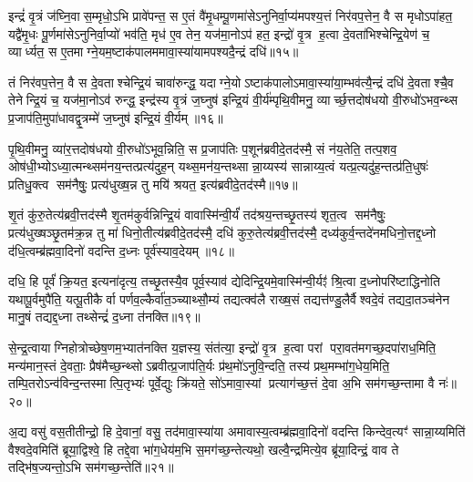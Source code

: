 {\anuvakamend[{अ॒स्य॒ मा वेदा द्यावा॑पृथि॒व्योर॑ब्रवी॒दिति॒ तस्माच्च॒त्वारि॑ च॥२॥}]}

इन्द्रं॑ वृ॒त्रं ज॑घ्नि॒वास॒म्मृधो॒ऽभि प्रावे॑पन्त॒ स ए॒तं वै॑मृ॒धम्पू॒णमा॑सेऽनुनिर्वा॒प्य॑मपश्य॒त्तं निर॑वप॒त्तेन॒ वै स मृधोऽपा॑हत॒ यद्वै॑मृ॒धः पू॒र्णमा॑सेऽनुनिर्वा॒प्यो॑ भव॑ति॒ मृध॑ ए॒व तेन॒ यज॑मा॒नोऽप॑ हत॒ इन्द्रो॑ वृ॒त्र ह॒त्वा दे॒वता॑भिश्चेन्द्रि॒येण॑ च॒ व्यार्ध्यत॒ स ए॒तमाग्ने॒यम॒ष्टाक॑पालममावा॒स्या॑यामपश्यदै॒न्द्रं दधि॑॥१५॥

तं निर॑वप॒त्तेन॒ वै स दे॒वताश्चेन्द्रि॒यं चावा॑रुन्द्ध॒ यदाग्ने॒योऽष्टाक॑पालोऽमावा॒स्या॑या॒म्भव॑त्यै॒न्द्रं दधि॑ दे॒वताश्चै॒व तेनेन्द्रि॒यं च॒ यज॑मा॒नोऽव॑ रुन्द्ध॒ इन्द्र॑स्य वृ॒त्रं ज॒घ्नुष॑ इन्द्रि॒यं वी॒र्य॑म्पृथि॒वीमनु॒ व्यार्च्छ॒त्तदोष॑धयो वी॒रुधो॑ऽभव॒न्थ्स प्र॒जाप॑ति॒मुपा॑धावद्वृ॒त्रम्मे॑ ज॒घ्नुष॑ इन्द्रि॒यं वी॒र्यम्॥१६॥

पृ॒थि॒वीमनु॒ व्या॑र॒त्तदोष॑धयो वी॒रुधो॑ऽभूव॒न्निति॒ स प्र॒जाप॑तिः प॒शून॑ब्रवीदे॒तद॑स्मै॒ सं न॑य॒तेति॒ तत्प॒शव॒ ओष॑धी॒भ्योऽध्या॒त्मन्थ्सम॑नय॒न्तत्प्रत्य॑दुह॒न् यथ्स॒मन॑य॒न्तथ्सान्ना॒य्यस्य॑ सान्नाय्य॒त्वं यत्प्र॒त्यदु॑ह॒न्तत्प्र॑ति॒धुषः॑ प्रतिधु॒क्त्व सम॑नैषुः॒ प्रत्य॑धुख्ष॒न्न तु मयि॑ श्रयत॒ इत्य॑ब्रवीदे॒तद॑स्मै॥१७॥

शृ॒तं कु॑रु॒तेत्य॑ब्रवी॒त्तद॑स्मै शृ॒तम॑कुर्वन्निन्द्रि॒यं वावास्मि॑न्वी॒र्यं॑ तद॑श्रय॒न्तच्छृ॒तस्य॑ शृत॒त्व सम॑नैषुः॒ प्रत्य॑धुख्षञ्छृ॒तम॑क्र॒न्न तु मा॑ धिनो॒तीत्य॑ब्रवीदे॒तद॑स्मै॒ दधि॑ कुरु॒तेत्य॑ब्रवी॒त्तद॑स्मै॒ दध्य॑कुर्व॒न्तदे॑नमधिनो॒त्तद्द॒ध्नो द॑धि॒त्वम्ब्र॑ह्मवा॒दिनो॑ वदन्ति द॒ध्नः पूर्व॑स्याव॒देयम्॥१८॥

दधि॒ हि पूर्वं॑ क्रि॒यत॒ इत्यना॑दृत्य॒ तच्छृ॒तस्यै॒व पूर्व॒स्याव॑ द्येदिन्द्रि॒यमे॒वास्मि॑न्वी॒र्यꣵ॑ श्रि॒त्वा द॒ध्नोपरि॑ष्टाद्धिनोति यथापू॒र्वमुपै॑ति॒ यत्पू॒तीकैर्वा पर्णव॒ल्कैर्वा॑त॒ञ्च्याथ्सौ॒म्यं तद्यत्क्व॑लै राख्ष॒सं तद्यत्त॑ण्डु॒लैर्वैश्वदे॒वं तद्यदा॒तञ्च॑नेन मानु॒षं तद्यद्द॒ध्ना तथ्सेन्द्रं॑ द॒ध्ना त॑नक्ति॥१९॥

से॒न्द्र॒त्वायाग्निहोत्रोच्छेष॒णम॒भ्यात॑नक्ति य॒ज्ञस्य॒ संत॑त्या॒ इन्द्रो॑ वृ॒त्र ह॒त्वा परां परा॒वत॑मगच्छ॒दपा॑राध॒मिति॒ मन्य॑मान॒स्तं दे॒वताः॒ प्रैष॑मैच्छ॒न्थ्सोऽब्रवीत्प्र॒जाप॑ति॒र्यः प्र॑थ॒मो॑ऽनुवि॒न्दति॒ तस्य॑ प्रथ॒मम्भा॑ग॒धेय॒मिति॒ तम्पि॒तरोऽन्व॑विन्द॒न्तस्मात्पि॒तृभ्यः॑ पूर्वे॒द्युः क्रि॑यते॒ सो॑ऽमावा॒स्यां प्रत्याग॑च्छ॒त्तं दे॒वा अ॒भि सम॑गच्छ॒न्तामा वै नः॑॥२०॥

अ॒द्य वसु॑ वस॒तीतीन्द्रो॒ हि दे॒वानां॒ वसु॒ तद॑मावा॒स्या॑या अमावास्य॒त्वम्ब्र॑ह्मवा॒दिनो॑ वदन्ति किन्देव॒त्यꣳ॑ सान्ना॒य्यमिति॑ वैश्वदे॒वमिति॑ ब्रूया॒द्विश्वे॒ हि तद्दे॒वा भा॑ग॒धेय॑म॒भि स॒मग॑च्छ॒न्तेत्यथो॒ खल्वै॒न्द्रमित्ये॒व ब्रू॑या॒दिन्द्रं॒ वाव ते तद्भि॑ष॒ज्यन्तो॒ऽभि सम॑गच्छ॒न्तेति॑॥२१॥

